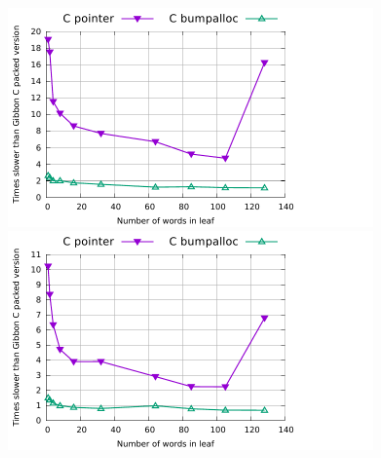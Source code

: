 \documentclass[a4paper,english]{lipics-v2016}
\begin{document}
\begin{figure}[t]
  \hspace{-4mm}
  \begin{minipage}{1.04\textwidth}
    \begin{minipage}{.49\textwidth}
      \centering
      \includegraphics[width=3.8in]{./figs/slowdown_leaves_build.pdf}
    \end{minipage}
    \begin{minipage}{.49\textwidth}
      \includegraphics[width=3.8in]{./figs/slowdown_leaves_add1.pdf}
    \end{minipage}
  \end{minipage}
  \vspace{-4mm}
  \caption{}
  \label{fig:vary-leaves}
\end{figure}


\end{document}
